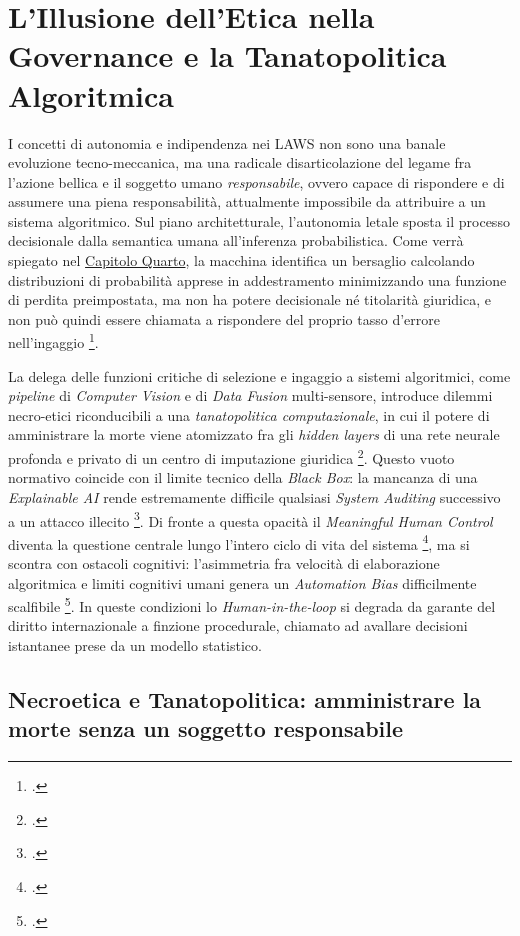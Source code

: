 \ifstampa\documentclass[a4paper,12pt,twoside,openright]{report}\else\documentclass[a4paper,12pt]{report}\fi
\newif\ifrevisione \revisionefalse
\DeclareRobustCommand{\rev}[1]{\ifrevisione{\color{blue!65!black}#1}\else#1\fi}
\begin{document}
\chapter[Governance e Tanatopolitica Algoritmica]{L'Illusione dell'Etica nella Governance e la Tanatopolitica Algoritmica}
\label{cap2}

I concetti di autonomia e indipendenza nei LAWS non sono una banale evoluzione
tecno-meccanica, ma una radicale disarticolazione del legame fra l'azione bellica
e il soggetto umano \textit{responsabile}, ovvero capace di rispondere e di
assumere una piena responsabilità, attualmente impossibile da attribuire a un
sistema algoritmico. Sul piano architetturale, l'autonomia letale sposta il
processo decisionale dalla semantica umana all'inferenza \rev{probabilistica}. Come verrà spiegato nel
\hyperref[cap4]{Capitolo Quarto}, la macchina identifica un bersaglio calcolando distribuzioni di
probabilità \rev{apprese in addestramento minimizzando} una funzione di perdita preimpostata, ma non ha potere decisionale né titolarità giuridica, e non può quindi essere
chiamata a rispondere del proprio tasso d'errore nell'ingaggio \footcite{simmons_edler_2025}.

La delega delle funzioni critiche di selezione e ingaggio a sistemi algoritmici,
come \textit{pipeline} di \textit{Computer Vision} e di \textit{Data Fusion}
multi-sensore, introduce dilemmi necro-etici riconducibili a una
\textit{tanatopolitica computazionale}, in cui il potere di amministrare la morte
viene atomizzato fra gli \textit{hidden layers} di una rete neurale profonda e
privato di un centro di imputazione giuridica \footcite{buffa_2025}. Questo vuoto
normativo coincide con il limite tecnico della \textit{Black Box}: la mancanza di
una \textit{Explainable AI} rende \rev{estremamente difficile} qualsiasi \textit{System Auditing}
successivo a un attacco illecito \footcite{wood_2024_xai, christie_2024}. Di
fronte a questa opacità il \textit{Meaningful Human Control} diventa la questione
centrale lungo l'intero ciclo di vita del sistema
\footcite{bode_2025, christie_2024}, ma si scontra con ostacoli cognitivi:
l'asimmetria fra velocità di elaborazione algoritmica e limiti cognitivi umani
genera un \textit{Automation Bias} difficilmente scalfibile
\footcite{horowitz_kahn_2024}. In queste condizioni lo \textit{Human-in-the-loop}
si degrada da garante del diritto internazionale a finzione procedurale, chiamato
ad avallare decisioni istantanee prese da un modello statistico.

\section{Necroetica e Tanatopolitica: amministrare la morte senza un soggetto responsabile}
\end{document}

